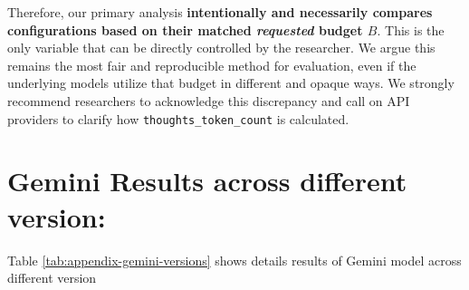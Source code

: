 \documentclass{article} %
\begin{document}
Therefore, our primary analysis \textbf{intentionally and necessarily compares configurations based on their matched \emph{requested} budget $B$}. This is the only variable that can be directly controlled by the researcher. We argue this remains the most fair and reproducible method for evaluation, even if the underlying models utilize that budget in different and opaque ways. We strongly recommend researchers to acknowledge this discrepancy and call on API providers to clarify how \texttt{thoughts\_token\_count} is calculated.

\section{Gemini Results across different version:}
Table \ref{tab:appendix-gemini-versions} shows details results of Gemini model across different version
\end{document}

